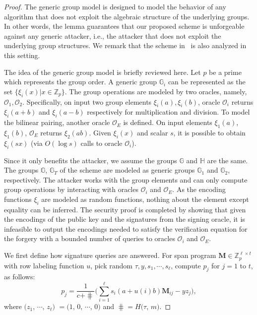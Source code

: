 \begin{proof}
  The generic group model is designed to model the behavior of any algorithm that does not exploit the algebraic structure of the underlying groups. In other words, the lemma guarantees that our proposed scheme is unforgeable against any generic attacker, i.e., the attacker that does not exploit the underlying group structures. We remark that the scheme in~\cite{10.1007/978-3-642-19074-2_24} is also analyzed in this setting.

  The idea of the generic group model is briefly reviewed here. Let $p$ be a prime which represents the group order. A generic group $\mathbb{G}_i$ can be represented as the set $\{\xi_i(x)| x\in\mathbb{Z}_p\}$. The group operations are modeled by two oracles, namely, $\mathcal{O}_1, \mathcal{O}_2$. Specifically, on input two group elements $\xi_i(a), \xi_i(b)$, oracle $\mathcal{O}_i$ returns $\xi_i(a+b)$ and $\xi_i(a-b)$ respectively for multiplication and division. To model the bilinear pairing, another oracle $\mathcal{O}_E$ is defined. On input elements $\xi_1(a)$, $\xi_1(b)$, $\mathcal{O}_E$ returns $\xi_2(ab)$.  Given $\xi_i(x)$ and scalar $s$, it is possible to obtain $\xi_i(sx)$ (via $O(\log s)$ calls to oracle $\mathcal{O}_i$).

  Since it only benefits the attacker, we assume the groups $\mathbb{G}$ and $\mathbb{H}$ are the same. The groups $\mathbb{G}$, $\mathbb{G}_T$ of the scheme are modeled as generic groups $\mathbb{G}_1$ and $\mathbb{G}_2$, respectively. The attacker works with the group elements and can only compute group operations by interacting with oracles $\mathcal{O}_i$ and $\mathcal{O}_E$. As the encoding functions $\xi_i$ are modeled as random functions, nothing about the element except equality can be inferred. The security proof is completed by showing that given the encodings of the public key and the signatures from the signing oracle, it is infeasible to output the encodings needed to satisfy the verification equation for the forgery with a bounded number of queries to oracles $\mathcal{O}_i$ and $\mathcal{O}_E$.

  We first define how signature queries are answered. For span program $\mathbf{M}\in \mathbb{Z}_p^{\ell \times t}$ with row labeling function $u$, pick random $\tau, y, s_1, \cdots, s_\ell$, compute $p_j$ for $j=1$ to $t$, as follows:
  $$
  p_j = \frac{1}{c + \hash}\big(\sum_{i=1}^\ell s_i (a+u(i)b)\mathbf{M}_{ij} - yz_j\big),
  $$ where $(z_1$, $\cdots$, $z_\ell)$ $= (1$, $0$, $\cdots$, $0)$ and $\hash = H(\tau$, $m)$.


\end{proof}
